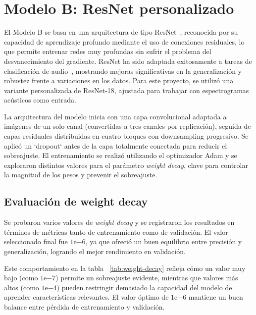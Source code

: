 \documentclass[conference]{IEEEtran}
\begin{document}
\section{Modelo B: ResNet personalizado}

El Modelo B se basa en una arquitectura de tipo ResNet~\cite{resnet_original}, reconocida por su capacidad de aprendizaje profundo mediante el uso de conexiones residuales, lo que permite entrenar redes muy profundas sin sufrir el problema del desvanecimiento del gradiente. ResNet ha sido adaptada exitosamente a tareas de clasificación de audio~\cite{resnet_audio, resnet_audio2}, mostrando mejoras significativas en la generalización y robustez frente a variaciones en los datos. Para este proyecto, se utilizó una variante personalizada de ResNet-18, ajustada para trabajar con espectrogramas acústicos como entrada.

La arquitectura del modelo inicia con una capa convolucional adaptada a imágenes de un solo canal (convertidas a tres canales por replicación), seguida de capas residuales distribuidas en cuatro bloques con downsampling progresivo. Se aplicó un `dropout` antes de la capa totalmente conectada para reducir el sobreajuste. El entrenamiento se realizó utilizando el optimizador Adam y se exploraron distintos valores para el parámetro \textit{weight decay}, clave para controlar la magnitud de los pesos y prevenir el sobreajuste.

\subsection{Evaluación de weight decay}

Se probaron varios valores de \textit{weight decay} y se registraron los resultados en términos de métricas tanto de entrenamiento como de validación. El valor seleccionado final fue $1\mathrm{e}{-6}$, ya que ofreció un buen equilibrio entre precisión y generalización, logrando el mejor rendimiento en validación.

Este comportamiento en la tabla ~\ref{tab:weight-decay} refleja cómo un valor muy bajo (como $1\mathrm{e}{-7}$) permite un sobreajuste evidente, mientras que valores más altos (como $1\mathrm{e}{-4}$) pueden restringir demasiado la capacidad del modelo de aprender características relevantes. El valor óptimo de $1\mathrm{e}{-6}$ mantiene un buen balance entre pérdida de entrenamiento y validación.
\end{document}
